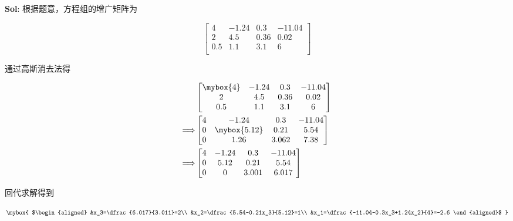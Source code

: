 \textbf{Sol}: 根据题意，方程组的增广矩阵为

$$
\begin{bmatrix}
    4&-1.24&0.3&-11.04\\
    2&4.5&0.36&0.02\\
    0.5&1.1&3.1&6\\
\end{bmatrix}
$$

通过高斯消去法得

$$
\begin{aligned}
    &\begin{bmatrix}
        \mybox{4}&-1.24&0.3&-11.04\\
        2&4.5&0.36&0.02\\
        0.5&1.1&3.1&6\\
    \end{bmatrix}\\
    \Longrightarrow&
    \begin{bmatrix}
        4&-1.24&0.3&-11.04\\
        0&\mybox{5.12}&0.21&5.54\\
        0&1.26&3.062&7.38\\
    \end{bmatrix}\\
    \Longrightarrow&
    \begin{bmatrix}
        4&-1.24&0.3&-11.04\\
        0&5.12&0.21&5.54\\
        0&0&3.001&6.017
    \end{bmatrix}
\end{aligned}
$$

回代求解得到

$$
\mybox{
$\begin{aligned}
    &x_3=\dfrac{6.017}{3.011}=2\\
    &x_2=\dfrac{5.54-0.21x_3}{5.12}=1\\
    &x_1=\dfrac{-11.04-0.3x_3+1.24x_2}{4}=-2.6
\end{aligned}$
}
$$

\vspace{12pt}


